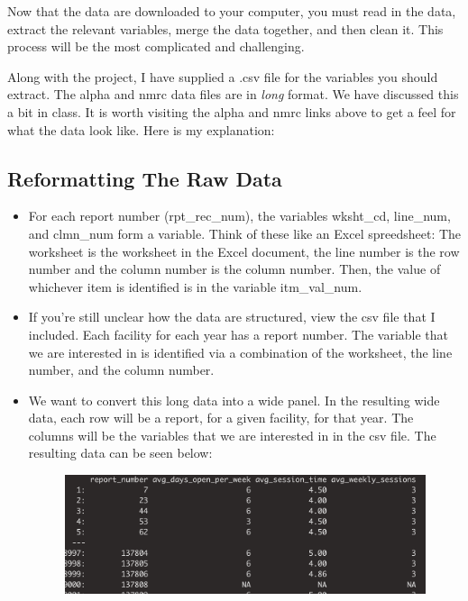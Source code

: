 \documentclass{article}
\begin{document}
Now that the data are downloaded to your computer, you must read in the data, extract the relevant variables, merge the data together, and then clean it. This process will be the most complicated and challenging.

Along with the project, I have supplied a .csv file for the variables you should extract. The alpha and nmrc data files are in \textit{long} format. We have discussed this a bit in class. It is worth visiting the alpha and nmrc links above to get a feel for what the data look like. Here is my explanation:

\subsection*{Reformatting The Raw Data}

\begin{itemize}
	\item For each report number (rpt\_rec\_num), the variables wksht\_cd, line\_num, and clmn\_num form a variable. Think of these like an Excel spreedsheet: The worksheet is the worksheet in the Excel document, the line number is the row number and the column number is the column number. Then, the value of whichever item is identified is in the variable itm\_val\_num.
	\item If you're still unclear how the data are structured, view the csv file that I included. Each facility for each year has a report number. The variable that we are interested in is identified via a combination of the worksheet, the line number, and the column number. 
	\item We want to convert this long data into a wide panel. In the resulting wide data, each row will be a report, for a given facility, for that year. The columns will be the variables that we are interested in in the csv file. The resulting data can be seen below: 

	\begin{figure}[H]
		\centering
		\includegraphics[scale=0.4]{wide_panel}
	\end{figure}
	

\end{itemize}
\end{document}
